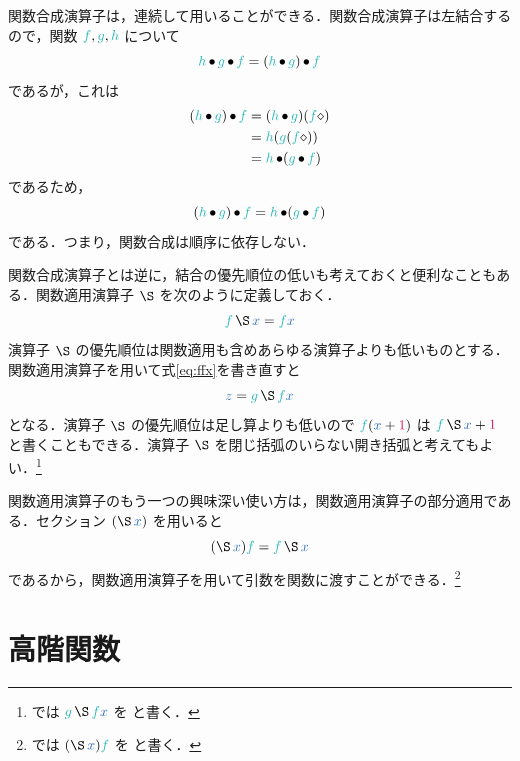 \documentclass[a5paper,twoside,fleqn,draft]{jsbook}
\begin{document}
\separator

関数合成演算子は，連続して用いることができる．関数合成演算子は左結合するので，関数 $\hFunc{f},\hFunc{g},\hFunc{h}$ について
\begin{equation}
  \hFunc{h}\hCompose\hFunc{g}\hCompose\hFunc{f}
    =(\hFunc{h}\hCompose\hFunc{g})\hCompose\hFunc{f}
\end{equation}
であるが，これは
\begin{align}
  (\hFunc{h}\hCompose\hFunc{g})\hCompose\hFunc{f}
    &=(\hFunc{h}\hCompose\hFunc{g})(\hFunc{f}\hAnonParam)\\
    &=\hFunc{h}(\hFunc{g}(\hFunc{f}\hAnonParam))\\
    &=\hFunc{h}\hCompose(\hFunc{g}\hCompose\hFunc{f})
\end{align}
であるため，
\begin{equation}
  (\hFunc{h}\hCompose\hFunc{g})\hCompose\hFunc{f}
  =\hFunc{h}\hCompose(\hFunc{g}\hCompose\hFunc{f})
\end{equation}
である．つまり，関数合成は順序に依存しない．

\separator

関数合成演算子とは逆に，結合の優先順位の低いも考えておくと便利なこともある．関数適用演算子 $\hApply$ を次のように定義しておく．
\begin{equation}
  \hFunc{f}\hApply\hVar{x}
  =\hFunc{f}\hVar{x}
\end{equation}
演算子 $\hApply$ の優先順位は関数適用も含めあらゆる演算子よりも低いものとする．関数適用演算子を用いて式\eqref{eq:ffx}を書き直すと
\begin{equation}
  \hVar{z}
  =\hFunc{g}\hApply\hFunc{f}\hVar{x}
\end{equation}
となる．演算子 $\hApply$ の優先順位は足し算よりも低いので $\hFunc{f}(\hVar{x}+\hConstant{1})$ は $\hFunc{f}\hApply\hVar{x}+\hConstant{1}$ と書くこともできる．演算子 $\hApply$ を閉じ括弧のいらない開き括弧と考えてもよい．\footnote{\haskell では $\hFunc{g}\hApply\hFunc{f}\hVar{x}$ を  と書く．}

関数適用演算子のもう一つの興味深い使い方は，関数適用演算子の部分適用である．セクション $(\hApply\hVar{x})$ を用いると
\begin{equation}
  (\hApply\hVar{x})\hFunc{f}
  =\hFunc{f}\hApply\hVar{x}
\end{equation}
であるから，関数適用演算子を用いて引数を関数に渡すことができる．\footnote{\haskell では $(\hApply\hVar{x})\hFunc{f}$ を  と書く．}

\section{高階関数}
\end{document}
